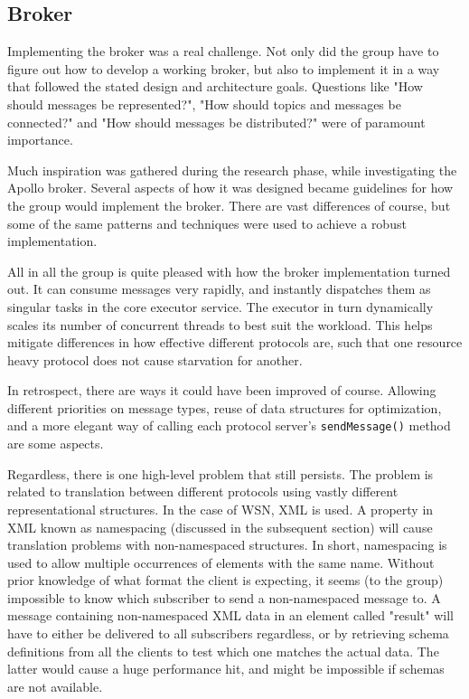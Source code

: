 \subsection{Broker}
\label{subsec:Implementation_broker}
Implementing the broker was a real challenge. Not only did the group have to figure out how to develop a working broker, but also to implement it in a way that followed the stated design and architecture goals. Questions like "How should messages be represented?", "How should topics and messages be connected?" and "How should messages be distributed?" were of paramount importance.

Much inspiration was gathered during the research phase, while investigating the Apollo broker. Several aspects of how it was designed became guidelines for how the group would implement the broker. There are vast differences of course, but some of the same patterns and techniques were used to achieve a robust implementation.

All in all the group is quite pleased with how the broker implementation turned out. It can consume messages very rapidly, and instantly dispatches them as singular tasks in the core executor service. The executor in turn dynamically scales its number of concurrent threads to best suit the workload. This helps mitigate differences in how effective different protocols are, such that one resource heavy protocol does not cause starvation for another.

In retrospect, there are ways it could have been improved of course. Allowing different priorities on message types, reuse of data structures for optimization, and a more elegant way of calling each protocol server's \verb!sendMessage()! method are some aspects.

Regardless, there is one high-level problem that still persists. The problem is related to translation between different protocols using vastly different representational structures. In the case of WSN, XML is used. A property in XML known as namespacing (discussed in the subsequent section) will cause translation problems with non-namespaced structures. In short, namespacing is used to allow multiple occurrences of elements with the same name. Without prior knowledge of what format the client is expecting, it seems (to the group) impossible to know which subscriber to send a non-namespaced message to. A message containing non-namespaced XML data in an element called "result" will have to either be delivered to all subscribers regardless, or by retrieving schema definitions from all the clients to test which one matches the actual data. The latter would cause a huge performance hit, and might be impossible if schemas are not available.

